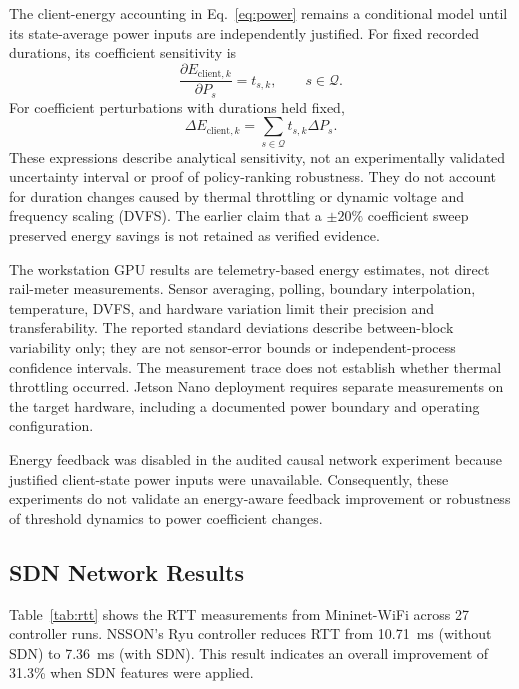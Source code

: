 \documentclass[journal]{IEEEtran}
\begin{document}
The client-energy accounting in Eq.~\eqref{eq:power} remains a
conditional model until its state-average power inputs are independently
justified. For fixed recorded durations, its coefficient sensitivity is
\begin{equation}
\frac{\partial E_{\mathrm{client},k}}{\partial P_s}
= t_{s,k},
\qquad s\in\mathcal{Q}.
\end{equation}
For coefficient perturbations with durations held fixed,
\begin{equation}
\Delta E_{\mathrm{client},k}
=
\sum_{s\in\mathcal{Q}} t_{s,k}\Delta P_s.
\end{equation}
These expressions describe analytical sensitivity, not an experimentally
validated uncertainty interval or proof of policy-ranking robustness.
They do not account for duration changes caused by thermal throttling
or dynamic voltage and frequency scaling (DVFS). The earlier claim
that a $\pm20\%$ coefficient sweep preserved energy savings is not
retained as verified evidence.

The workstation GPU results are telemetry-based energy estimates,
not direct rail-meter measurements. Sensor averaging, polling,
boundary interpolation, temperature, DVFS, and hardware variation
limit their precision and transferability. The reported standard
deviations describe between-block variability only; they are not
sensor-error bounds or independent-process confidence intervals.
The measurement trace does not establish whether thermal throttling
occurred. Jetson Nano deployment requires separate measurements on
the target hardware, including a documented power boundary and
operating configuration.

Energy feedback was disabled in the audited causal network experiment
because justified client-state power inputs were unavailable.
Consequently, these experiments do not validate an energy-aware
feedback improvement or robustness of threshold dynamics to power
coefficient changes.

\subsection{SDN Network Results}

Table~\ref{tab:rtt} shows the RTT measurements from Mininet-WiFi across
27 controller runs. NSSON's Ryu controller reduces RTT from 10.71~ms (without SDN) to 7.36~ms (with SDN). This result indicates an overall improvement of 31.3\% when SDN features were applied.
\end{document}
